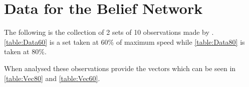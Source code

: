 \chapter{Data for the Belief Network}\label{AppendixMIData}
The following is the collection of 2 sets of 10 observations made
by \name. \autoref{table:Data60} is a set taken at 60\% of maximum speed while
\autoref{table:Data80} is taken at 80\%.

When analysed these observations provide the vectors which can be seen in
\autoref{table:Vec80} and \autoref{table:Vec60}.
